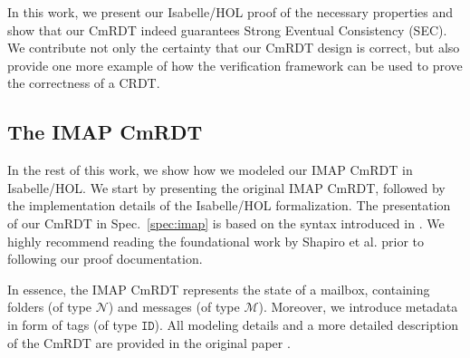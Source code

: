 \documentclass[11pt,a4paper,DIV=11]{article}
\begin{document}
In this work, we present our Isabelle/HOL proof of the necessary properties and
show that our CmRDT indeed guarantees Strong Eventual Consistency (SEC).
We contribute not only the certainty that our CmRDT design is correct,
but also provide one more example of how the verification framework
can be used to prove the correctness of a CRDT.


\subsection{The IMAP CmRDT}

In the rest of this work, we show how we modeled our IMAP CmRDT in Isabelle/HOL.
We start by presenting the original IMAP CmRDT, followed by the implementation
details of the Isabelle/HOL formalization. The presentation of our CmRDT in
Spec.~\ref{spec:imap} is based on the syntax introduced in \cite{shapiro_report}.
We highly recommend reading the foundational work by Shapiro et al{.} prior to
following our proof documentation.

In essence, the IMAP CmRDT represents the state of a mailbox, containing folders
(of type $\mathcal{N}$) and messages (of type $\mathcal{M}$). Moreover, we introduce
metadata in form of tags (of type $\texttt{ID}$). All modeling details and a more
detailed description of the CmRDT are provided in the original paper \cite{pluto}.
\end{document}
